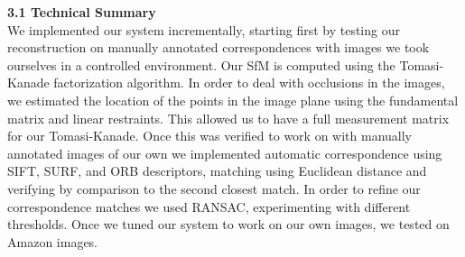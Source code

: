 \documentclass[12pt]{article}
\begin{document}
\begin{multicols}{2}
{\large \textbf{3.1 Technical Summary}}\\
We implemented our system incrementally, starting first by testing our reconstruction on manually annotated correspondences with images we took ourselves in a controlled environment. Our SfM is computed using the Tomasi-Kanade factorization algorithm. In order to deal with occlusions in the images, we estimated the location of the points in the image plane using the fundamental matrix and linear restraints. This allowed us to have a full measurement matrix for our Tomasi-Kanade. Once this was verified to work on with manually annotated images of our own we implemented automatic correspondence using SIFT, SURF, and ORB descriptors, matching using Euclidean distance and verifying by comparison to the second closest match. In order to refine our correspondence matches we used RANSAC, experimenting with different thresholds. Once we tuned our system to work on our own images, we tested on Amazon images. 

\end{multicols}
\end{document}
